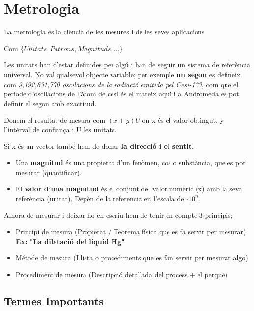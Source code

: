 \documentclass[12pt]{article}
\begin{document}
\tableofcontents

\newpage

\section{Metrologia}

La metrologia és la ciència de les mesures i de les seves aplicacions

Com $\{Unitats, Patrons, Magnituds, \dots\}$

Les unitats han d'estar definides per algú i han de seguir un sistema de referència universal. No val qualsevol objecte variable; per exemple \textbf{un segon} es defineix com \textit{9,192,631,770 oscilacions de la radiació emitida pel Cesi-133}, com que el periode d'oscilacions de l'àtom de cesi és el mateix aquí i a Andromeda es pot definir el segon amb exactitud.

Donem el resultat de mesura com $\boxed{(x \pm y)U}$ on x és el valor obtingut, y l'intèrval de confiança i U les unitats.

Si x és un vector també hem de donar \textbf{la direcció i el sentit}.

\begin{itemize}
    \item Una \textbf{magnitud} és una propietat d'un fenòmen, cos o substància, que es pot mesurar (quantificar).
    \item El \textbf{valor d'una magnitud} és el conjunt del valor numéric (x) amb la seva referència (unitat). Depèn de la referencia en l'escala de $\cdot 10^n$.
\end{itemize}

Alhora de mesurar i deixar-ho en escriu hem de tenir en compte 3 principis;

\begin{itemize}
    \item Principi de mesura (Propietat / Teorema física que es fa servir per mesurar) \textbf{Ex: "La dilatació del líquid Hg"}
    \item Métode de mesura (Llista o procediments que es fan servir per mesurar algo)
    \item Procediment de mesura (Descripció detallada del process + el perquè)
\end{itemize}

\subsection{Termes Importants}
\end{document}
